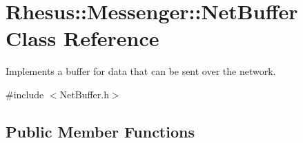 \hypertarget{class_rhesus_1_1_messenger_1_1_net_buffer}{\section{Rhesus\-:\-:Messenger\-:\-:Net\-Buffer Class Reference}
\label{class_rhesus_1_1_messenger_1_1_net_buffer}
}


Implements a buffer for data that can be sent over the network.  




{\ttfamily \#include $<$Net\-Buffer.\-h$>$}

\subsection*{Public Member Functions}
